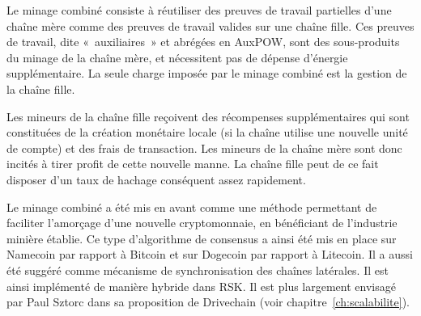 %
%
%

Le minage combiné consiste à réutiliser des preuves de travail partielles d'une chaîne mère comme des preuves de travail valides sur une chaîne fille. Ces preuves de travail, dite «~auxiliaires~» et abrégées en AuxPOW, sont des sous-produits du minage de la chaîne mère, et nécessitent pas de dépense d'énergie supplémentaire. La seule charge imposée par le minage combiné est la gestion de la chaîne fille.

Les mineurs de la chaîne fille reçoivent des récompenses supplémentaires qui sont constituées de la création monétaire locale (si la chaîne utilise une nouvelle unité de compte) et des frais de transaction. Les mineurs de la chaîne mère sont donc incités à tirer profit de cette nouvelle manne. La chaîne fille peut de ce fait disposer d'un taux de hachage conséquent assez rapidement.

Le minage combiné a été mis en avant comme une méthode permettant de faciliter l'amorçage d'une nouvelle cryptomonnaie, en bénéficiant de l'industrie minière établie. Ce type d'algorithme de consensus a ainsi été mis en place sur Namecoin par rapport à Bitcoin et sur Dogecoin par rapport à Litecoin. Il a aussi été suggéré comme mécanisme de synchronisation des chaînes latérales. Il est ainsi implémenté de manière hybride dans RSK. Il est plus largement envisagé par Paul Sztorc dans sa proposition de Drivechain (voir chapitre~\ref{ch:scalabilite}).


